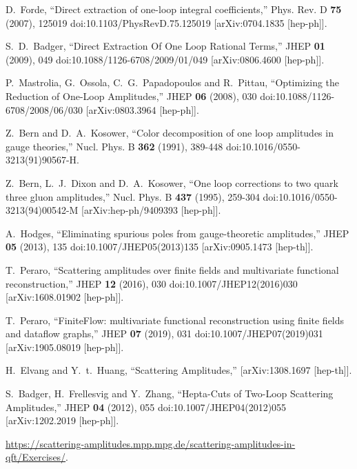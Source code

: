 D.~Forde,
``Direct extraction of one-loop integral coefficients,''
Phys. Rev. D \textbf{75} (2007), 125019
doi:10.1103/PhysRevD.75.125019
[arXiv:0704.1835 [hep-ph]].

S.~D.~Badger,
``Direct Extraction Of One Loop Rational Terms,''
JHEP \textbf{01} (2009), 049
doi:10.1088/1126-6708/2009/01/049
[arXiv:0806.4600 [hep-ph]].

P.~Mastrolia, G.~Ossola, C.~G.~Papadopoulos and R.~Pittau,
``Optimizing the Reduction of One-Loop Amplitudes,''
JHEP \textbf{06} (2008), 030
doi:10.1088/1126-6708/2008/06/030
[arXiv:0803.3964 [hep-ph]].

Z.~Bern and D.~A.~Kosower,
``Color decomposition of one loop amplitudes in gauge theories,''
Nucl. Phys. B \textbf{362} (1991), 389-448
doi:10.1016/0550-3213(91)90567-H.

Z.~Bern, L.~J.~Dixon and D.~A.~Kosower,
``One loop corrections to two quark three gluon amplitudes,''
Nucl. Phys. B \textbf{437} (1995), 259-304
doi:10.1016/0550-3213(94)00542-M
[arXiv:hep-ph/9409393 [hep-ph]].

A.~Hodges,
``Eliminating spurious poles from gauge-theoretic amplitudes,''
JHEP \textbf{05} (2013), 135
doi:10.1007/JHEP05(2013)135
[arXiv:0905.1473 [hep-th]].

T.~Peraro,
``Scattering amplitudes over finite fields and multivariate functional reconstruction,''
JHEP \textbf{12} (2016), 030
doi:10.1007/JHEP12(2016)030
[arXiv:1608.01902 [hep-ph]].

T.~Peraro,
``FiniteFlow: multivariate functional reconstruction using finite fields and dataflow graphs,''
JHEP \textbf{07} (2019), 031
doi:10.1007/JHEP07(2019)031
[arXiv:1905.08019 [hep-ph]].

H.~Elvang and Y.~t.~Huang,
``Scattering Amplitudes,''
[arXiv:1308.1697 [hep-th]].

S.~Badger, H.~Frellesvig and Y.~Zhang,
``Hepta-Cuts of Two-Loop Scattering Amplitudes,''
JHEP \textbf{04} (2012), 055
doi:10.1007/JHEP04(2012)055
[arXiv:1202.2019 [hep-ph]].

\href{https://scattering-amplitudes.mpp.mpg.de/scattering-amplitudes-in-qft/Exercises/}{https://scattering-amplitudes.mpp.mpg.de/scattering-amplitudes-in-qft/Exercises/}.